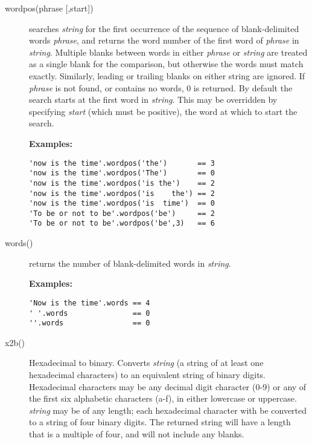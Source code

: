 \begin{description}
\item[wordpos(phrase [,start{]})]\label{refwordpos}
searches \emph{string} for the first occurrence of the sequence
of blank-delimited words \emph{phrase}, and returns the word number
of the first word of \emph{phrase} in \emph{string}.  Multiple
blanks between words in either \emph{phrase} or \emph{string}
are treated as a single blank for the comparison, but otherwise the
words must match exactly.  Similarly, leading or trailing blanks on
either string are ignored.
If \emph{phrase} is not found, or contains no words, 0 is returned.
 By default the search starts at the first word in \emph{string}.
This may be overridden by specifying \emph{start} (which must be
positive), the word at which to start the search.
 
\textbf{Examples:}
\begin{lstlisting}
'now is the time'.wordpos('the')       == 3
'now is the time'.wordpos('The')       == 0
'now is the time'.wordpos('is the')    == 2
'now is the time'.wordpos('is    the') == 2
'now is the time'.wordpos('is  time')  == 0
'To be or not to be'.wordpos('be')     == 2
'To be or not to be'.wordpos('be',3)   == 6
\end{lstlisting}

\item[words()]\label{refwords}
returns the number of blank-delimited words in \emph{string}.
 
\textbf{Examples:}
\begin{lstlisting}
'Now is the time'.words == 4
' '.words               == 0
''.words                == 0
\end{lstlisting}

\item[x2b()]\label{refx2b}
Hexadecimal to binary.
Converts \emph{string} (a string of at least one hexadecimal
characters) to an equivalent string of binary digits.
Hexadecimal characters may be any decimal digit character (0-9) or any
of the first six alphabetic characters (a-f), in either lowercase or
uppercase.
 \emph{string} may be of any length; each hexadecimal character
with be converted to a string of four binary digits.
The returned string will have a length that is a multiple of four, and
will not include any blanks.
 

\end{description}
